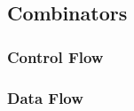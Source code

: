 \subsection{Combinators}\label{sec:primer:combinators}

\subsubsection{Control Flow}\label{sec:primer:control-flow}

\subsubsection{Data Flow}\label{sec:primer:data-flow}

%
%
%
%
